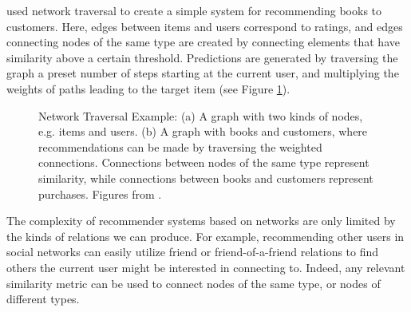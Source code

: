 \cite{Huang2002} used network traversal to create a simple system for recommending books to customers.
Here, edges between items and users correspond to ratings, and edges connecting nodes of the same type
are created by connecting elements that have similarity above a certain threshold. Predictions are generated
by traversing the graph a preset number of steps starting at the current user, and multiplying the weights
of paths leading to the target item (see Figure \ref{fig:book-graphs}).

\begin{figure}[t]
  \centering
  \caption[Example of Network Traversal]{Network Traversal Example: (a) A graph with two kinds of nodes,
    e.g. items and users. (b) A graph with books and customers, where recommendations
    can be made by traversing the weighted connections. Connections between nodes of the same type
    represent similarity, while connections between books and customers represent purchases.
    Figures from \cite{Huang2002}.}
  \label{fig:book-graphs}
\end{figure}
%
The complexity of recommender systems based on networks are only limited by the kinds of relations we can produce.
For example, recommending other users in social networks can easily utilize friend or friend-of-a-friend relations
to find others the current user might be interested in connecting to. Indeed, any relevant similarity metric can be used to
connect nodes of the same type, or nodes of different types.


